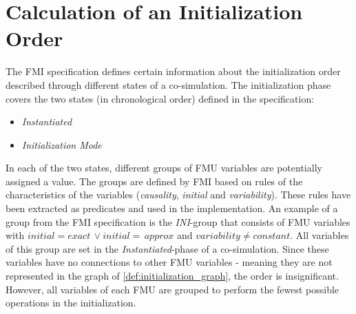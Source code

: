 \section{Calculation of an Initialization Order}\label{sc:initilization}
The FMI specification defines certain information about the initialization order described through different states of a co-simulation. The initialization phase covers the two states (in chronological order) defined in the specification:
\begin{itemize}
    \item \textit{Instantiated}
    \item \textit{Initialization Mode}
\end{itemize}
In each of the two states, different groups of FMU variables are potentially assigned a value. The groups are defined by FMI based on rules of the characteristics of the variables (\textit{causality}, \textit{initial} and \textit{variability}). These rules have been extracted as predicates and used in the implementation. 
An example of a group from the FMI specification is the \textit{INI}-group that consists of FMU variables with $initial = exact\, \lor initial = \,approx $  and $variability \neq constant$. All variables of this group are set in the \textit{Instantiated}-phase of a co-simulation. Since these variables have no connections to other FMU variables - meaning they are not represented in the graph of \cref{def:initialization_graph}, the order is insignificant. 
However, all variables of each FMU are grouped to perform the fewest possible operations in the initialization. 

